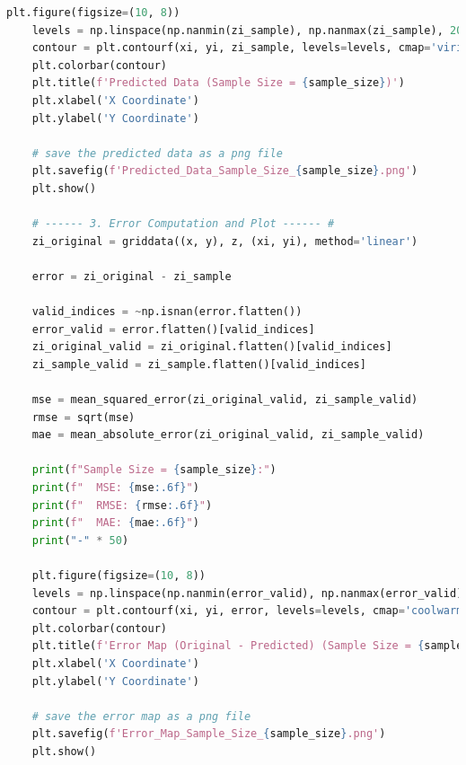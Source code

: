 \documentclass{swmcmthesis}
\begin{document}
\begin{lstlisting}[language=python,caption={The python programme for Problem 1}]
    plt.figure(figsize=(10, 8))
    levels = np.linspace(np.nanmin(zi_sample), np.nanmax(zi_sample), 20)
    contour = plt.contourf(xi, yi, zi_sample, levels=levels, cmap='viridis') 
    plt.colorbar(contour) 
    plt.title(f'Predicted Data (Sample Size = {sample_size})')
    plt.xlabel('X Coordinate')
    plt.ylabel('Y Coordinate')

    # save the predicted data as a png file
    plt.savefig(f'Predicted_Data_Sample_Size_{sample_size}.png')
    plt.show()

    # ------ 3. Error Computation and Plot ------ #
    zi_original = griddata((x, y), z, (xi, yi), method='linear')

    error = zi_original - zi_sample

    valid_indices = ~np.isnan(error.flatten()) 
    error_valid = error.flatten()[valid_indices]
    zi_original_valid = zi_original.flatten()[valid_indices]
    zi_sample_valid = zi_sample.flatten()[valid_indices]

    mse = mean_squared_error(zi_original_valid, zi_sample_valid)
    rmse = sqrt(mse)
    mae = mean_absolute_error(zi_original_valid, zi_sample_valid)

    print(f"Sample Size = {sample_size}:")
    print(f"  MSE: {mse:.6f}")
    print(f"  RMSE: {rmse:.6f}")
    print(f"  MAE: {mae:.6f}")
    print("-" * 50)

    plt.figure(figsize=(10, 8))
    levels = np.linspace(np.nanmin(error_valid), np.nanmax(error_valid), 20)
    contour = plt.contourf(xi, yi, error, levels=levels, cmap='coolwarm')  
    plt.colorbar(contour) 
    plt.title(f'Error Map (Original - Predicted) (Sample Size = {sample_size})')
    plt.xlabel('X Coordinate')
    plt.ylabel('Y Coordinate')

    # save the error map as a png file
    plt.savefig(f'Error_Map_Sample_Size_{sample_size}.png')
    plt.show()
 \end{lstlisting}
 
\end{document}
